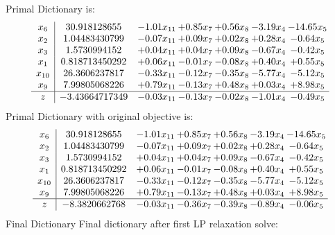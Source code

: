 \documentclass[8pt]{article}
\begin{document}
Primal Dictionary is:
\[\begin{array}{c| c c@{\hskip 2pt} c@{\hskip 2pt} c@{\hskip 2pt} c@{\hskip 2pt} c@{\hskip 2pt} }
 x_{6}   &  30.918128655 & -1.01 x_{11} & +  0.85 x_{7} & +  0.56 x_{8} & -3.19 x_{4} & -14.65 x_{5}\\
 x_{2}   &  1.04483430799 & -0.07 x_{11} & +  0.09 x_{7} & +  0.02 x_{8} & +  0.28 x_{4} & -0.64 x_{5}\\
 x_{3}   &  1.5730994152 & +  0.04 x_{11} & +  0.04 x_{7} & +  0.09 x_{8} & -0.67 x_{4} & -0.42 x_{5}\\
 x_{1}   &  0.818713450292 & +  0.06 x_{11} & -0.01 x_{7} & -0.08 x_{8} & +  0.40 x_{4} & +  0.55 x_{5}\\
 x_{10}   &  26.3606237817 & -0.33 x_{11} & -0.12 x_{7} & -0.35 x_{8} & -5.77 x_{4} & -5.12 x_{5}\\
 x_{9}   &  7.99805068226 & +  0.79 x_{11} & -0.13 x_{7} & +  0.48 x_{8} & +  0.03 x_{4} & +  8.98 x_{5}\\
\hline
z    &  -3.43664717349 & -0.03 x_{11} & -0.13 x_{7} & -0.02 x_{8} & -1.01 x_{4} & -0.49 x_{5}\\
\end{array}\]
Primal Dictionary with original objective is:
\[\begin{array}{c| c c@{\hskip 2pt} c@{\hskip 2pt} c@{\hskip 2pt} c@{\hskip 2pt} c@{\hskip 2pt} }
 x_{6}   &  30.918128655 & -1.01 x_{11} & +  0.85 x_{7} & +  0.56 x_{8} & -3.19 x_{4} & -14.65 x_{5}\\
 x_{2}   &  1.04483430799 & -0.07 x_{11} & +  0.09 x_{7} & +  0.02 x_{8} & +  0.28 x_{4} & -0.64 x_{5}\\
 x_{3}   &  1.5730994152 & +  0.04 x_{11} & +  0.04 x_{7} & +  0.09 x_{8} & -0.67 x_{4} & -0.42 x_{5}\\
 x_{1}   &  0.818713450292 & +  0.06 x_{11} & -0.01 x_{7} & -0.08 x_{8} & +  0.40 x_{4} & +  0.55 x_{5}\\
 x_{10}   &  26.3606237817 & -0.33 x_{11} & -0.12 x_{7} & -0.35 x_{8} & -5.77 x_{4} & -5.12 x_{5}\\
 x_{9}   &  7.99805068226 & +  0.79 x_{11} & -0.13 x_{7} & +  0.48 x_{8} & +  0.03 x_{4} & +  8.98 x_{5}\\
\hline
z    &  -8.3820662768 & -0.03 x_{11} & -0.36 x_{7} & -0.39 x_{8} & -0.89 x_{4} & -0.06 x_{5}\\
\end{array}\]
Final Dictionary
Final dictionary after first LP relaxation solve: 
\end{document}
